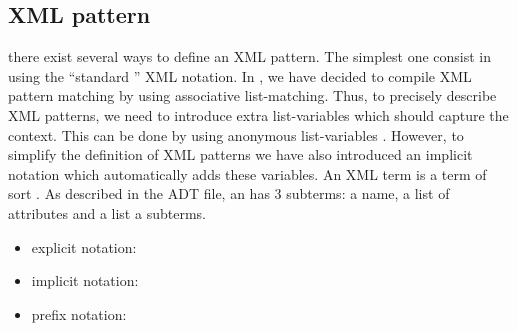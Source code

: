  
\subsection{XML pattern}
  there exist several ways to define an XML pattern. The simplest one
  consist in using the ``standard '' XML notation. 
  In \TOM, we have decided to compile XML pattern matching by using
  associative list-matching. Thus, to precisely describe XML patterns,
  we need to introduce extra list-variables which should capture the
  context. This can be done by using anonymous list-variables
  \lex{\_*}.
  However, to simplify the definition of XML patterns we have also
  introduced an implicit notation which automatically adds these
  variables.
  An XML term is a term of sort . As described in the ADT
  file, an  has 3 subterms: a name, a list of
  attributes and a list a subterms.

  \begin{itemize}
  \item explicit notation: 

  \item implicit notation:

  \item prefix notation:
  \end{itemize}

